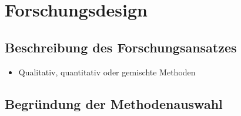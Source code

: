 \section{Forschungsdesign}
\label{ch_05Forschungsdesign}


\subsection{Beschreibung des Forschungsansatzes}
\label{ch_05Beschreibung des Forschungsansatzes}
\begin{itemize}
	\item Qualitativ, quantitativ oder gemischte Methoden
\end{itemize}

\subsection{Begründung der Methodenauswahl}
\label{ch_05Begründung der Methodenauswahl}